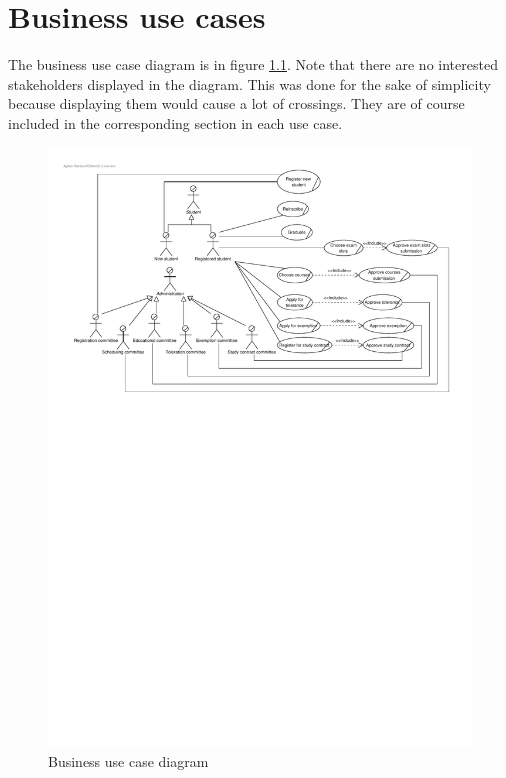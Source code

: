 \chapter{Business use cases}
\label{business-uc}

\par The business use case diagram is in figure
\ref{fig:business-use-case-diagram}. Note that there are no interested
stakeholders displayed in the diagram. This was done for the sake of
simplicity because displaying them would cause a lot of crossings. They are of
course included in the corresponding section in each use case.

\begin{figure}[H]
	\begin{centering}
		\includegraphics[width=\paperwidth,
		angle=90]{figs/business-use-case-diagram.pdf}
		\caption{Business use case diagram}
		\label{fig:business-use-case-diagram}
	\end{centering}
\end{figure}

